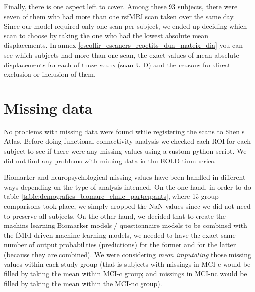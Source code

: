 \documentclass[a4paper,12pt]{elsarticle}  %
\begin{document}
Finally, there is one aspect left to cover. Among these 93 subjects, there were seven of them who had more than one rsfMRI scan taken over the same day. Since our model required only one scan per subject, we ended up deciding which scan to choose by taking the one who had the lowest absolute mean displacements. In annex \ref{escollir_escaners_repetits_dun_mateix_dia} you can see which subjects had more than one scan, the exact values of mean absolute displacements for each of those scans (scan UID) and the reasons for direct exclusion or inclusion of them.



\section{Missing data} %

No problems with missing data were found while registering the scans to Shen's Atlas. Before doing functional connectivity analysis we checked each ROI for each subject to see if there were any missing values using a custom python script. We did not find any problems with missing data in the BOLD time-series.

Biomarker and neuropsychological missing values have been handled in different ways depending on the type of analysis intended. On the one hand, in order to do table \ref{table:demografics_biomarc_clinic_participants}, where 13 group comparisons took place, we simply dropped the NaN values since we did not need to preserve all subjects. On the other hand, we decided that to create the machine learning Biomarker models / questionnaire models to be combined with the fMRI driven machine learning models, we needed to have the exact same number of output probabilities (predictions) for the former and for the latter (because they are combined). We were considering \textit{mean imputating} those missing values within each study group (that is subjects with missings in MCI-c would be filled by taking the mean within MCI-c group; and missings in MCI-nc would be filled by taking the mean within the MCI-nc group).
\end{document}
